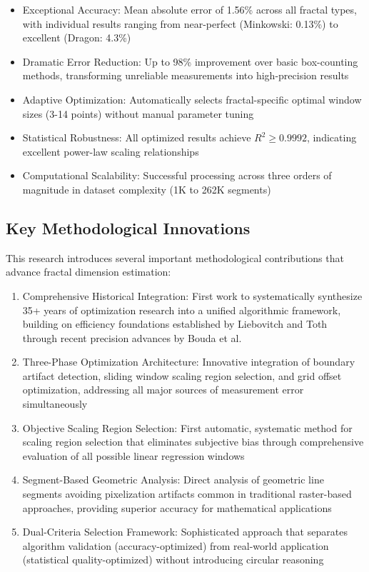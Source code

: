\documentclass[preprint,12pt]{elsarticle}
\def\textbf#1{#1}%
\begin{document}
\begin{itemize}
\item \textbf{Exceptional Accuracy}: Mean absolute error of 1.56\% across all fractal types, with individual results ranging from near-perfect (Minkowski: 0.13\%) to excellent (Dragon: 4.3\%)
\item \textbf{Dramatic Error Reduction}: Up to 98\% improvement over basic box-counting methods, transforming unreliable measurements into high-precision results
\item \textbf{Adaptive Optimization}: Automatically selects fractal-specific optimal window sizes (3-14 points) without manual parameter tuning
\item \textbf{Statistical Robustness}: All optimized results achieve $R^2 \geq 0.9992$, indicating excellent power-law scaling relationships
\item \textbf{Computational Scalability}: Successful processing across three orders of magnitude in dataset complexity (1K to 262K segments)
\end{itemize}

\subsection{Key Methodological Innovations}

This research introduces several important methodological contributions that advance fractal dimension estimation:

\begin{enumerate}
\item \textbf{Comprehensive Historical Integration}: First work to systematically synthesize 35+ years of optimization research into a unified algorithmic framework, building on efficiency foundations established by Liebovitch and Toth~\cite{liebovitch1989} through recent precision advances by Bouda et al.~\cite{bouda2016}

\item \textbf{Three-Phase Optimization Architecture}: Innovative integration of boundary artifact detection, sliding window scaling region selection, and grid offset optimization, addressing all major sources of measurement error simultaneously

\item \textbf{Objective Scaling Region Selection}: First automatic, systematic method for scaling region selection that eliminates subjective bias through comprehensive evaluation of all possible linear regression windows

\item \textbf{Segment-Based Geometric Analysis}: Direct analysis of geometric line segments avoiding pixelization artifacts common in traditional raster-based approaches, providing superior accuracy for mathematical applications

\item \textbf{Dual-Criteria Selection Framework}: Sophisticated approach that separates algorithm validation (accuracy-optimized) from real-world application (statistical quality-optimized) without introducing circular reasoning
\end{enumerate}
\end{document}

